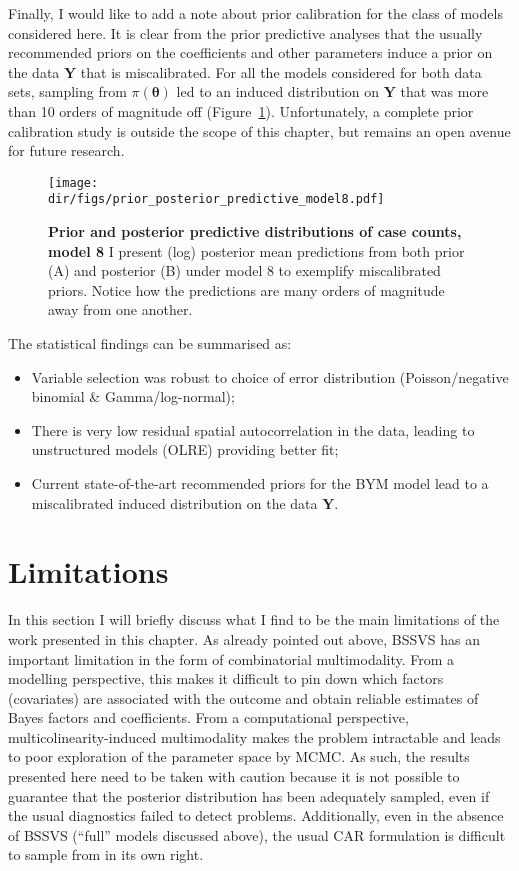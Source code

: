Finally, I would like to add a note about prior calibration for the class of models considered here.
It is clear from the prior predictive analyses that the usually recommended priors on the coefficients and other parameters induce a prior on the data $\boldsymbol Y$ that is miscalibrated.
For all the models considered for both data sets, sampling from $\pi(\boldsymbol\theta)$ led to an induced distribution  on $\boldsymbol Y$ that was more than 10 orders of magnitude off (Figure~\ref{fig:predictiveY}).
Unfortunately, a complete prior calibration study is outside the scope of this chapter, but remains an open avenue for future research.

\begin{figure}[htbp]
  \centering
  \texttt{[image: \\dir/figs/prior\_posterior\_predictive\_model8.pdf]}
  \caption[Prior and posterior predictive distributions of case counts, model 8]{\textbf{Prior and posterior predictive distributions of case counts, model 8}
  I present (log) posterior mean predictions from both prior (A) and posterior (B) under model 8 to exemplify miscalibrated priors.
  Notice how the predictions are many orders of magnitude away from one another.
  }
  \label{fig:predictiveY}
\end{figure}

The statistical findings can be summarised as:
\begin{itemize}
 \item Variable selection was robust to choice of error distribution (Poisson/negative binomial \& Gamma/log-normal);
 \item There is very low residual spatial autocorrelation in the data, leading to unstructured models (OLRE) providing better fit;
 \item Current state-of-the-art recommended priors for the BYM model lead to a miscalibrated induced distribution on the data $\boldsymbol Y$.
\end{itemize}

\section{Limitations}

In this section I will briefly discuss what I find to be the main limitations of the work presented in this chapter.
As already pointed out above, BSSVS has an important limitation in the form of combinatorial multimodality.
From a modelling perspective, this makes it difficult to pin down which factors (covariates) are associated with the outcome and obtain reliable estimates of Bayes factors and coefficients.
From a computational perspective, multicolinearity-induced multimodality makes the problem intractable and leads to poor exploration of the parameter space by MCMC.
As such, the results presented here need to be taken with caution because it is not possible to guarantee that the posterior distribution has been adequately sampled, even if the usual diagnostics failed to detect problems.
Additionally, even in the absence of BSSVS (``full'' models discussed above), the usual CAR formulation is difficult to sample from in its own right.

